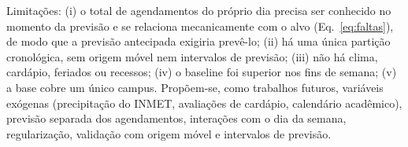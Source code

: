 \documentclass[11pt]{article}
\begin{document}
Limitações: (i) o total de agendamentos do próprio dia precisa ser conhecido no momento da previsão e se relaciona mecanicamente com o alvo (Eq.~\ref{eq:faltas}), de modo que a previsão antecipada exigiria prevê-lo; (ii) há uma única partição cronológica, sem origem móvel nem intervalos de previsão; (iii) não há clima, cardápio, feriados ou recessos; (iv) o baseline foi superior nos fins de semana; (v) a base cobre um único campus. Propõem-se, como trabalhos futuros, variáveis exógenas (precipitação do INMET, avaliações de cardápio, calendário acadêmico), previsão separada dos agendamentos, interações com o dia da semana, regularização, validação com origem móvel e intervalos de previsão.



\end{document}
